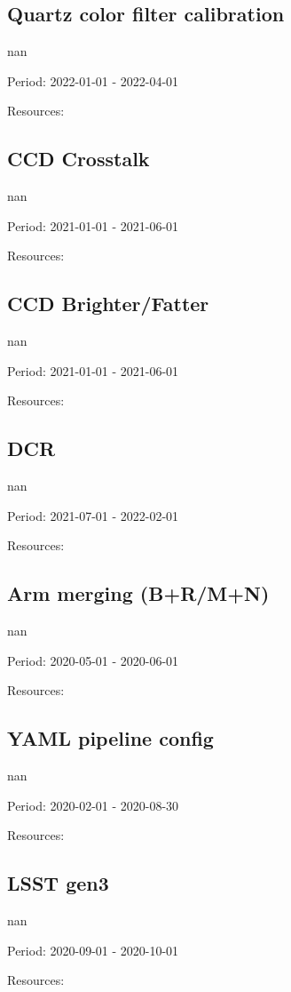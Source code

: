 \subsection{Quartz color filter calibration}

nan

Period: 2022-01-01 - 2022-04-01

Resources: 

\subsection{CCD Crosstalk}

nan

Period: 2021-01-01 - 2021-06-01

Resources: 

\subsection{CCD Brighter/Fatter}

nan

Period: 2021-01-01 - 2021-06-01

Resources: 

\subsection{DCR}

nan

Period: 2021-07-01 - 2022-02-01

Resources: 

\subsection{Arm merging (B+R/M+N)}

nan

Period: 2020-05-01 - 2020-06-01

Resources: 

\subsection{YAML pipeline config}

nan

Period: 2020-02-01 - 2020-08-30

Resources: 

\subsection{LSST gen3}

nan

Period: 2020-09-01 - 2020-10-01

Resources: 

